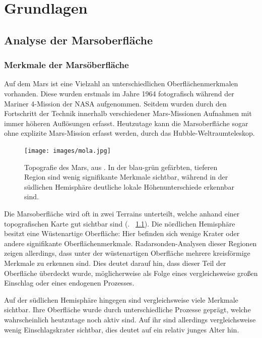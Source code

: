 \chapter{Grundlagen}
\label{chap:basics}

\section{Analyse der Marsoberfläche}
\label{sec:mars_analysis}

\subsection{Merkmale der Marsöberfläche}
\label{ssec:mars_surface}
Auf dem Mars ist eine Vielzahl an unterschiedlichen Oberflächenmerkmalen vorhanden. Diese wurden erstmals im Jahre 1964 fotografisch während der Mariner 4-Mission der NASA aufgenommen. \cite{mariner4} Seitdem wurden durch den Fortschritt der Technik innerhalb verschiedener Mars-Missionen Aufnahmen mit immer höheren Auflösungen erfasst. Heutzutage kann die Marsoberfläche sogar ohne explizite Mars-Mission erfasst werden, \zB durch das Hubble-Weltraumteleskop.

\begin{figure}[H]
	\centering
	\texttt{[image: images/mola.jpg]}
	\captionsetup{width=.8\textwidth}
	\caption{Topografie des Mars, aus \cite{mola}. In der blau-grün gefärbten, tieferen Region sind wenig signifikante Merkmale sichtbar, während in der südlichen Hemisphäre deutliche lokale Höhenunterschiede erkennbar sind.}
	\label{fig:mola}
\end{figure}

Die Marsoberfläche wird oft in zwei Terrains unterteilt, welche anhand einer topografischen Karte gut sichtbar sind (\vgl. \figurename~\ref{fig:mola}). Die nördlichen Hemisphäre besitzt eine Wüstenartige Oberfläche: Hier befinden sich wenige Krater oder andere signifikante Oberflächenmerkmale. Radarsonden-Analysen dieser Regionen zeigen allerdings, dass unter der wüstenartigen Oberfläche mehrere kreisförmige Merkmale zu erkennen sind. Dies deutet darauf hin, dass dieser Teil der Oberfläche überdeckt wurde, möglicherweise als Folge eines vergleichsweise großen Einschlag oder eines endogenen Prozesses. \cite[Kap.~7]{greeley_13}

Auf der südlichen Hemisphäre hingegen sind vergleichsweise viele Merkmale sichtbar. Ihre Oberfläche wurde durch unterschiedliche Prozesse geprägt, welche wahrscheinlich heutzutage noch aktiv sind. Auf ihr sind allerdings vergleichsweise wenig Einschlagskrater sichtbar, dies deutet auf ein relativ junges Alter hin. \cite[Kap.~7]{greeley_13}

